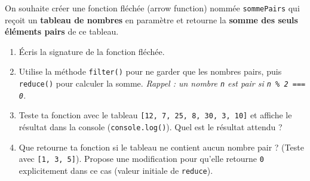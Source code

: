 \documentclass[11pt]{article}
\begin{document}
\begin{exercice}
On souhaite créer une fonction fléchée (arrow function) nommée \texttt{sommePairs} qui reçoit un \textbf{tableau de nombres} en paramètre et retourne la \textbf{somme des seuls éléments pairs} de ce tableau.
\begin{enumerate}
    \item Écris la signature de la fonction fléchée.
    \item Utilise la méthode \texttt{filter()} pour ne garder que les nombres pairs, puis \texttt{reduce()} pour calculer la somme. \textit{Rappel : un nombre \texttt{n} est pair si \texttt{n \% 2 === 0}.}
    \item Teste ta fonction avec le tableau \texttt{[12, 7, 25, 8, 30, 3, 10]} et affiche le résultat dans la console (\texttt{console.log()}). Quel est le résultat attendu ?
    \item Que retourne ta fonction si le tableau ne contient aucun nombre pair ? (Teste avec \texttt{[1, 3, 5]}). Propose une modification pour qu'elle retourne \texttt{0} explicitement dans ce cas (valeur initiale de \texttt{reduce}).
\end{enumerate}
\end{exercice}
\end{document}
